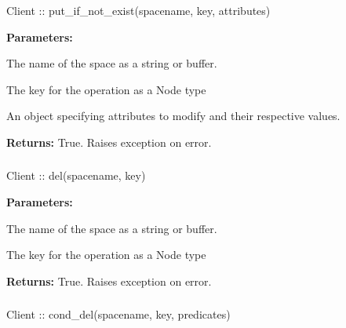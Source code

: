 \subsubsection{}
\label{api:nodejs:put_if_not_exist}
\begin{javascriptcode}
Client :: put_if_not_exist(spacename, key, attributes)
\end{javascriptcode}


\noindent\textbf{Parameters:}
\begin{description}[labelindent=\widthof{{\code{attributes}}},leftmargin=*,noitemsep,nolistsep,align=right]
\item[\code{spacename}] The name of the space as a string or buffer.
\item[\code{key}] The key for the operation as a Node type
\item[\code{attributes}] An object specifying attributes to modify and their respective values.
\end{description}

\noindent\textbf{Returns:}
True.  Raises exception on error.

\subsubsection{}
\label{api:nodejs:del}
\begin{javascriptcode}
Client :: del(spacename, key)
\end{javascriptcode}


\noindent\textbf{Parameters:}
\begin{description}[labelindent=\widthof{{\code{spacename}}},leftmargin=*,noitemsep,nolistsep,align=right]
\item[\code{spacename}] The name of the space as a string or buffer.
\item[\code{key}] The key for the operation as a Node type
\end{description}

\noindent\textbf{Returns:}
True.  Raises exception on error.

\subsubsection{}
\label{api:nodejs:cond_del}
\begin{javascriptcode}
Client :: cond_del(spacename, key, predicates)
\end{javascriptcode}


